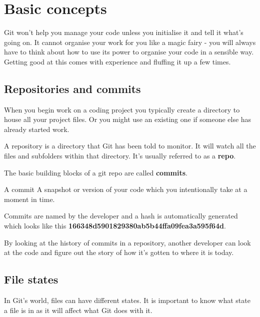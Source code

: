 \section{Basic concepts}

Git won't help you manage your code unless you initialise it and tell it what's going on. It cannot organise your work for you like a magic fairy - you will always have to think about how to use its power to organise your code in a sensible way. 
\\

Getting good at this comes with experience and fluffing it up a few times.


\subsection{Repositories and commits}

When you begin work on a coding project you typically create a directory to house all your project files. Or you might use an existing one if someone else has already started work.

\begin{infobox}{A repository}
	is a directory that Git has been told to monitor. It will watch all the files and subfolders within that directory. It's usually referred to as a \textbf{repo}.
\end{infobox}

The basic building blocks of a git repo are called \textbf{commits}.

\begin{infobox}{A commit}
	A snapshot or version of your code which you intentionally take at a moment in time. 
\end{infobox}
	
Commits are named by the developer and a hash is automatically generated which looks like this \textbf{166348d5901829380ab5b44ffa09fea3a595f64d}.

By looking at the history of commits in a repository, another developer can look at the code and figure out the story of how it's gotten to where it is today.



\subsection{File states}

In Git's world, files can have different states. It is important to know what state a file is in as it will affect what Git does with it. 
\\

